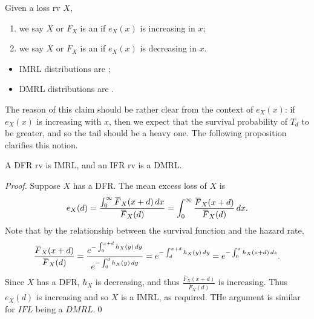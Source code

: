 \documentclass[notoc,notitlepage]{tufte-book}
\begin{document}
\begin{defn}\label{defn:increasing_and_decreasing_mean_residual_lifetime}
  Given a loss rv $X$,
  \begin{enumerate}
    \item we say $X$ or $F_X$ is an  if $e_X(x)$ is increasing in $x$;
    \item we say $X$ or $F_X$ is an  if $e_X(x)$ is decreasing in $x$.
  \end{enumerate}
\end{defn}

\begin{note}
  \begin{itemize}
    \item IMRL distributions are ;
    \item DMRL distributions are .
  \end{itemize}

  The reason of this claim should be rather clear from the context of $e_X(x)$: if $e_X(x)$ is increasing with $x$, then we expect that the survival probability of $T_d$ to be greater, and so the tail should be a heavy one. The following proposition clarifies this notion.
\end{note}

\begin{propo}\label{propo:relation_between_dfr_ifr_and_imrl_dmrl}
  A DFR rv is IMRL, and an IFR rv is a DMRL.
\end{propo}

\begin{proof}
  Suppose $X$ has a DFR. The mean excess loss of $X$ is
  \begin{equation*}
    e_X(d) = \frac{\int_{0}^{\infty} \bar{F}_X(x + d) \dif{x} }{\bar{F}_X(d)} = \int_{0}^{\infty} \frac{\bar{F}_X(x + d)}{\bar{F}_X(d)} \dif{x}.
  \end{equation*}
  Note that by the relationship between the survival function and the hazard rate,
  \begin{equation*}
    \frac{\bar{F}_X(x + d)}{\bar{F}_X(d)} = \frac{e^{-\int_{0}^{x + d} h_X(y) \dif{y} }}{e^{-\int_{0}^{d} h_X(y) \dif{y} }} = e^{-\int_{d}^{x + d} h_X(y) \dif{y} } = e^{-\int_{0}^{x} h_X(z + d) \dif{z} }.
  \end{equation*}
  Since $X$ has a DFR, $h_X$ is decreasing, and thus $\frac{\bar{F}_X(x + d)}{\bar{F}_X(d)}$ is increasing. Thus $e_X(d)$ is increasing and so $X$ is a IMRL, as required. THe argument is similar for $IFL$ being a $DMRL$.\qed\
\end{proof}
\end{document}
